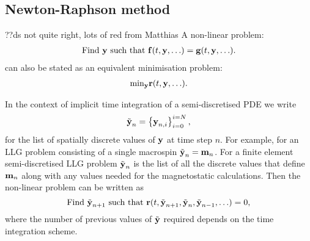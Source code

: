 \subsection{Newton-Raphson method}
\label{sec:newt-raph}

??ds not quite right, lots of red from Matthias
A non-linear problem:
\begin{equation}
  \begin{aligned}
    \text{Find $\boldsymbol{\mathrm{y}}$ such that } {\boldsymbol{\mathrm{f}}}(t, \boldsymbol{\mathrm{y}}, \ldots) = {\boldsymbol{\mathrm{g}}}(t, \boldsymbol{\mathrm{y}}, \ldots).
  \end{aligned}
\end{equation}
can also be stated as an equivalent minimisation problem:
\begin{equation}
  \label{eq:non-lin-system}
  \begin{aligned}
    \text{min}_{\boldsymbol{\mathrm{y}}} \boldsymbol{\mathrm{r}}(t, \boldsymbol{\mathrm{y}}, \ldots).
  \end{aligned}
\end{equation}

In the context of implicit time integration of a semi-discretised PDE we write
\begin{equation}
  \tilde{\boldsymbol{\mathrm{y}}}_n = \left\{ {\boldsymbol{\mathrm{y}}_{n,i}} \right\}_{i=0}^{i=N},
\end{equation}
for the list of spatially discrete values of $\boldsymbol{\mathrm{y}}$ at time step $n$.
For example, for an LLG problem consisting of a single macrospin $\tilde{\boldsymbol{\mathrm{y}}}_n = \boldsymbol{\mathrm{m}}_n$.
For a finite element semi-discretised LLG problem $\tilde{\boldsymbol{\mathrm{y}}}_n$ is the list of all the discrete values that define $\boldsymbol{\mathrm{m}}_n$ along with any values needed for the magnetostatic calculations.
Then the non-linear problem can be written as
\begin{equation}
  \text{Find $\tilde{\boldsymbol{\mathrm{y}}}_{n+1}$ such that } \boldsymbol{\mathrm{r}}(t, \tilde{\boldsymbol{\mathrm{y}}}_{n+1}, \tilde{\boldsymbol{\mathrm{y}}}_n, \tilde{\boldsymbol{\mathrm{y}}}_{n-1}, \ldots) = 0,
\end{equation}
where the number of previous values of $\tilde{\boldsymbol{\mathrm{y}}}$ required depends on the time integration scheme.

